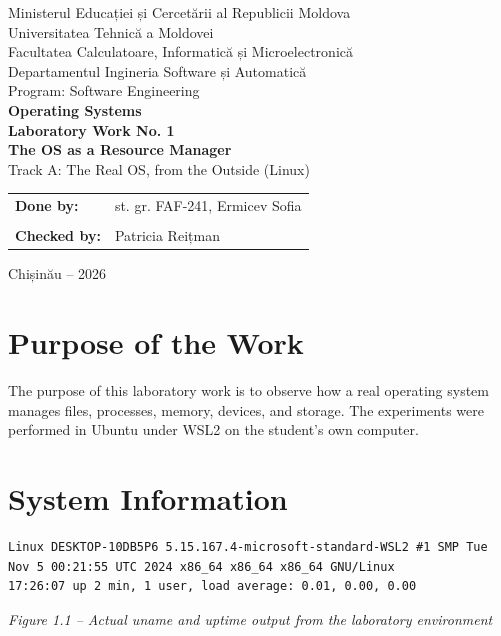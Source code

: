\documentclass[12pt,a4paper]{article}
\newcommand{\figcap}[1]{\begin{center}\small\textit{#1}\end{center}\vspace{0.4em}}
\begin{document}
\begin{titlepage}
\begin{center}
{\large Ministerul Educației și Cercetării al Republicii Moldova}\\[0.3cm]
{\large Universitatea Tehnică a Moldovei}\\[0.3cm]
{\large Facultatea Calculatoare, Informatică și Microelectronică}\\[0.3cm]
{\large Departamentul Ingineria Software și Automatică}\\[0.3cm]
{\large Program: Software Engineering}\\[2.0cm]
{\Large \textbf{Operating Systems}}\\[0.8cm]
{\LARGE \textbf{Laboratory Work No. 1}}\\[0.5cm]
{\Large \textbf{The OS as a Resource Manager}}\\[0.35cm]
{\large Track A: The Real OS, from the Outside (Linux)}
\vfill
\begin{flushright}
\begin{tabular}{ll}
\textbf{Done by:} & st. gr. FAF-241, Ermicev Sofia \\
\\
\textbf{Checked by:} & Patricia Reițman
\end{tabular}
\end{flushright}
\vfill
{\large Chișinău -- 2026}
\end{center}
\end{titlepage}
\tableofcontents
\newpage

\section{Purpose of the Work}
The purpose of this laboratory work is to observe how a real operating system manages files, processes, memory, devices, and storage. The experiments were performed in Ubuntu under WSL2 on the student's own computer.

\section{System Information}
\begin{lstlisting}
Linux DESKTOP-10DB5P6 5.15.167.4-microsoft-standard-WSL2 #1 SMP Tue Nov 5 00:21:55 UTC 2024 x86_64 x86_64 x86_64 GNU/Linux
17:26:07 up 2 min, 1 user, load average: 0.01, 0.00, 0.00
\end{lstlisting}
\figcap{Figure 1.1 -- Actual uname and uptime output from the laboratory environment}
\end{document}
